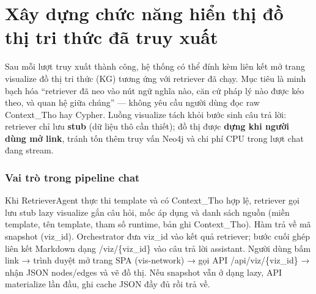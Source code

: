 \documentclass[../DoAn.tex]{subfiles}
\begin{document}

\section{Xây dựng chức năng hiển thị đồ thị tri thức đã truy xuất}
\label{section:kg-viz}

Sau mỗi lượt truy xuất thành công, hệ thống có thể đính kèm liên kết mở trang visualize đồ thị tri thức (KG) tương ứng với retriever đã chạy. Mục tiêu là minh bạch hóa ``retriever đã neo vào nút ngữ nghĩa nào, căn cứ pháp lý nào được kéo theo, và quan hệ giữa chúng'' --- không yêu cầu người dùng đọc raw Context\_Tho hay Cypher. Luồng visualize tách khỏi bước sinh câu trả lời: retriever chỉ lưu \textbf{stub} (dữ liệu thô cần thiết); đồ thị được \textbf{dựng khi người dùng mở link}, tránh tốn thêm truy vấn Neo4j và chi phí CPU trong lượt chat đang stream.

\subsubsection{Vai trò trong pipeline chat}

Khi RetrieverAgent thực thi template và có Context\_Tho hợp lệ, retriever gọi lưu stub lazy visualize gắn câu hỏi, mốc áp dụng và danh sách nguồn (miền template, tên template, tham số runtime, bản ghi Context\_Tho). Hàm trả về mã snapshot (viz\_id). Orchestrator đưa viz\_id vào kết quả retriever; bước cuối ghép liên kết Markdown dạng /viz/\{viz\_id\} vào câu trả lời assistant. Người dùng bấm link → trình duyệt mở trang SPA (vis-network) → gọi API /api/viz/\{viz\_id\} → nhận JSON nodes/edges và vẽ đồ thị. Nếu snapshot vẫn ở dạng lazy, API materialize lần đầu, ghi cache JSON đầy đủ rồi trả về.
\end{document}
